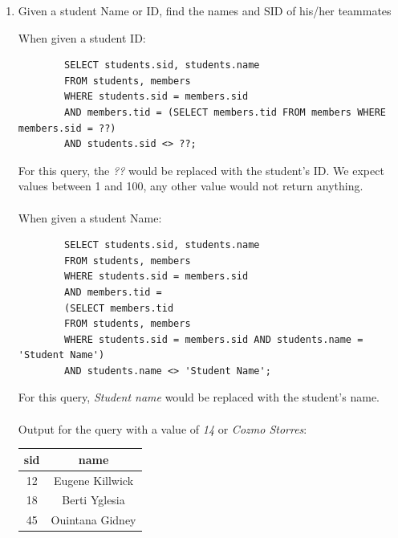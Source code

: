 \documentclass[11pt,letterpaper]{article}
\begin{document}
\begin{enumerate}
		\item Given a student Name or ID, find the names and SID of his/her teammates
		
		When given a student ID:
		\begin{verbatim}
		SELECT students.sid, students.name 
		FROM students, members 
		WHERE students.sid = members.sid 
		AND members.tid = (SELECT members.tid FROM members WHERE members.sid = ??) 
		AND students.sid <> ??;
		\end{verbatim}
		For this query, the \textit{??} would be replaced with the student's ID. We expect values between 1 and 100, any other value would not return anything.\\
		\\
		When given a student Name:
		\begin{verbatim}
		SELECT students.sid, students.name 
		FROM students, members 
		WHERE students.sid = members.sid 
		AND members.tid = 
		(SELECT members.tid 
		FROM students, members 
		WHERE students.sid = members.sid AND students.name = 'Student Name') 
		AND students.name <> 'Student Name';
		\end{verbatim}
		For this query, \textit{Student name} would be replaced with the student's name.\\
		\\
		Output for the query with a value of \textit{14} or \textit{Cozmo Storres}:
		\begin{center}
			\begin{tabular}{ | c | c | }
				\hline
				sid & name \\
				\hline
				12 & Eugene Killwick \\
				18 & Berti Yglesia \\
				45 & Ouintana Gidney \\
				\hline
			\end{tabular}
		\end{center}
		
	\end{enumerate}
	
\end{document}
